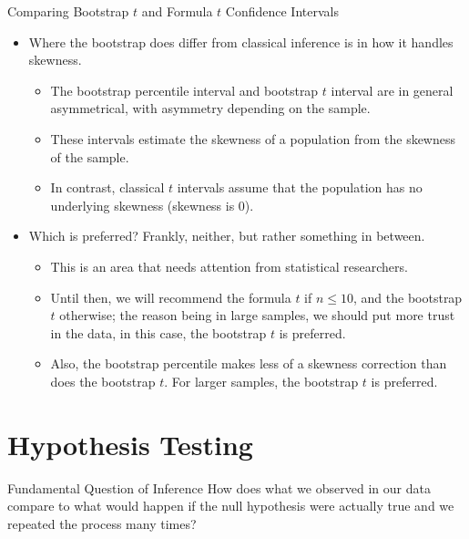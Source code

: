 \documentclass[
  ignorenonframetext,
]{beamer}
\providecommand{\tightlist}{%
  \setlength{\itemsep}{0pt}\setlength{\parskip}{0pt}}
\begin{document}
\begin{frame}{Comparing Bootstrap \(t\) and Formula \(t\) Confidence
Intervals}
\label{comparing-bootstrap-t-and-formula-t-confidence-intervals}
\begin{itemize}
\item
  Where the bootstrap does differ from classical inference is in how it
  handles skewness.

  \begin{itemize}
  \tightlist
  \item
    The bootstrap percentile interval and bootstrap \(t\) interval are
    in general asymmetrical, with asymmetry depending on the sample.
  \item
    These intervals estimate the skewness of a population from the
    skewness of the sample.
  \item
    In contrast, classical \(t\) intervals assume that the population
    has no underlying skewness (skewness is 0).
  \end{itemize}
\item
  Which is preferred? Frankly, neither, but rather something in between.

  \begin{itemize}
  \tightlist
  \item
    This is an area that needs attention from statistical researchers.
  \item
    Until then, we will recommend the formula \(t\) if \(n\leq 10\), and
    the bootstrap \(t\) otherwise; the reason being in large samples, we
    should put more trust in the data, in this case, the bootstrap \(t\)
    is preferred.
  \item
    Also, the bootstrap percentile makes less of a skewness correction
    than does the bootstrap \(t\). For larger samples, the bootstrap
    \(t\) is preferred.
  \end{itemize}
\end{itemize}
\end{frame}

\section{Hypothesis Testing}\label{hypothesis-testing}

\begin{frame}{Fundamental Question of Inference}
\label{fundamental-question-of-inference}
How does what we observed in our data compare to what would happen if
the null hypothesis were actually true and we repeated the process many
times?
\end{frame}
\end{document}
